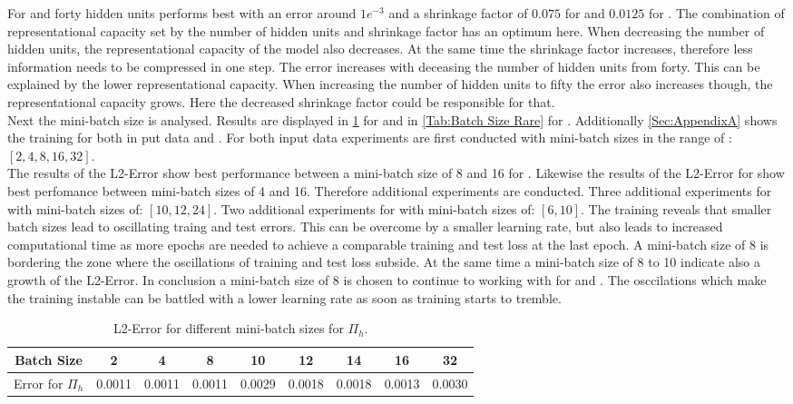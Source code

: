 For \hy and \rare forty hidden units performs best with an error around \(1e^{-3}\) and a shrinkage factor of \(0.075\) for \hy and \(0.0125\) for \rare. The combination of representational capacity set by the number of hidden units and shrinkage factor has an optimum here.  When decreasing the number of hidden units, the representational capacity of the model also decreases. At the same time the shrinkage factor increases, therefore less information needs to be compressed in one step. The error increases with deceasing the number of hidden units from forty. This can be explained by the lower representational capacity. When increasing the number of hidden units to fifty the error also increases though, the representational capacity grows. Here the decreased shrinkage factor could be responsible for that.\\
Next the mini-batch size is analysed. Results are displayed in \cref{Tab:Batch Size Hydro} for \hy  and in \cref{Tab:Batch Size Rare} for \rare. Additionally \cref{Sec:AppendixA} shows the training for both in put data \hy and \rare. For both input data experiments are first conducted with mini-batch sizes in the range of : \([2,4,8,16,32]\).\\ The results of the L2-Error show best performance between a mini-batch size of 8 and 16 for \hy. Likewise the results of the L2-Error for \rare show best perfomance between mini-batch sizes of 4 and 16. Therefore additional experiments are conducted. Three additional experiments for \hy with mini-batch sizes of: \([10,12,24]\). Two additional experiments for \rare with mini-batch sizes of: \([6,10]\). The training reveals that smaller batch sizes lead to oscillating traing and test errors. This can be overcome by a smaller learning rate, but also leads to increased computational time as more epochs are needed to achieve a comparable training and test loss at the last epoch. A mini-batch size of 8 is bordering the zone where the oscillations of training and test loss subside. At the same time a mini-batch size of 8 to 10 indicate also a growth of the L2-Error. In conclusion a mini-batch size of 8 is chosen to continue to working with for \hy and \rare. The osccilations which make the training instable can be battled with a lower learning rate as soon as training starts to tremble.\\
\begin{table}[!htbp]\centering
	\begin{tabular}{ |c|c|c|c|c|c|c|c|c| }
		\hline
		Batch Size & 2 & 4 & 8 & 10 & 12 & 14 & 16 & 32 \\ [.5ex]
		\hline
		Error for \(\Pi_h\) & 0.0011 & 0.0011 & 0.0011 & 0.0029 & 0.0018& 0.0018 & 0.0013 & 0.0030 \\ \hline
	\end{tabular}
	\caption{L2-Error for different mini-batch sizes for \(\Pi_h\).}
	\label{Tab:Batch Size Hydro}
\end{table}

